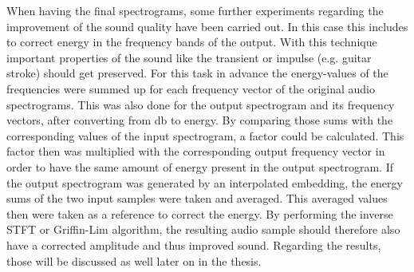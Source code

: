 When having the final spectrograms, some further experiments regarding the improvement of the sound quality have been carried out. In this case this includes to correct energy in the frequency bands of the output. With this technique important properties of the sound like the transient or impulse (e.g. guitar stroke) should get preserved. For this task in advance the energy-values of the frequencies were summed up for each frequency vector of the original audio spectrograms. This was also done for the output spectrogram and its frequency vectors, after converting from db to energy. By comparing those sums with the corresponding values of the input spectrogram, a factor could be calculated. This factor then was multiplied with the corresponding output frequency vector in order to have the same amount of energy present in the output spectrogram. If the output spectrogram was generated by an interpolated embedding, the energy sums of the two input samples were taken and averaged. This averaged values then were taken as a reference to correct the energy. By performing the inverse STFT or Griffin-Lim algorithm, the resulting audio sample should therefore also have a corrected amplitude and thus improved sound. Regarding the results, those will be discussed as well later on in the thesis.


